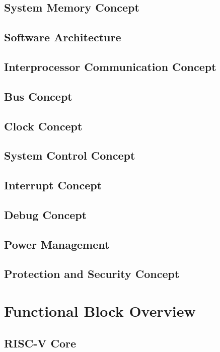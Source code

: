\subsection{System Memory Concept}

\subsection{Software Architecture}

\subsection{Interprocessor Communication Concept}

\subsection{Bus Concept}

\subsection{Clock Concept}

\subsection{System Control Concept}

\subsection{Interrupt Concept}

\subsection{Debug Concept}

\subsection{Power Management}

\subsection{Protection and Security Concept}

\section{Functional Block Overview}

\subsection{RISC-V Core}

